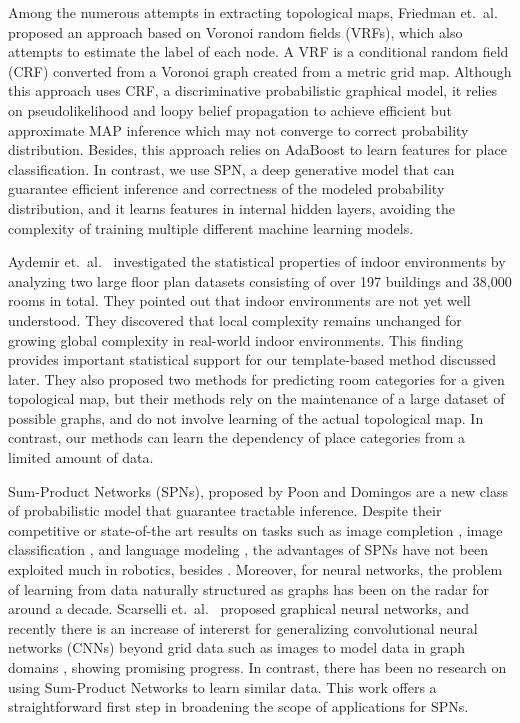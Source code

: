 \documentclass[10pt, titlepage]{article}
\theoremstyle{definition}
\begin{document}
Among the numerous attempts in extracting topological maps, Friedman et.~al.~\cite{friedman2007voronoi} proposed an approach based on Voronoi random fields (VRFs), which also attempts to estimate the label of each node. A VRF is a conditional random field (CRF) converted from a Voronoi graph created from a metric grid map. Although this approach uses CRF, a discriminative probabilistic graphical model, it relies on pseudolikelihood and loopy belief propagation \cite{murphy1999loopy} to achieve efficient but approximate MAP inference which may not converge to correct probability distribution. Besides, this approach relies on AdaBoost to learn features for place classification. In contrast, we use SPN, a deep generative model that can guarantee efficient inference and correctness of the modeled probability distribution, and it learns features in internal hidden layers, avoiding the complexity of training multiple different machine learning models.

Aydemir et.~al.~\cite{aydemir2012can} investigated the statistical properties of indoor environments by analyzing two large floor plan datasets consisting of over 197 buildings and 38,000 rooms in total. They pointed out that indoor environments are not yet well understood. They discovered that local complexity remains unchanged for growing global complexity in real-world indoor environments. This finding provides important statistical support for our template-based method discussed later. They also proposed two methods for predicting room categories for a given topological map, but their methods rely on the maintenance of a large dataset of possible graphs, and do not involve learning of the actual topological map. In contrast, our methods can learn the dependency of place categories from a limited amount of data.

Sum-Product Networks (SPNs), proposed by Poon and Domingos \cite{poon2011sum} are a new class of probabilistic model that guarantee tractable inference. Despite their competitive or state-of-the art results on tasks such as image completion \cite{poon2011sum}, image classification \cite{gens2012discriminative}, and language modeling \cite{cheng2014language}, the advantages of SPNs have not been exploited much in robotics, besides \cite{pronobis2016learning}. Moreover, for neural networks, the problem of learning from data naturally structured as graphs has been on the radar for around a decade. Scarselli et.~al.~\cite{scarselli2009graph} proposed graphical neural networks, and recently there is an increase of intererst for generalizing convolutional neural networks (CNNs) beyond grid data such as images to model data in graph domains \cite{defferrard2016convolutional}\cite{kipf2016semi}, showing promising progress. In contrast, there has been no research on using Sum-Product Networks to learn similar data. This work offers a straightforward first step in broadening the scope of applications for SPNs.
\end{document}
